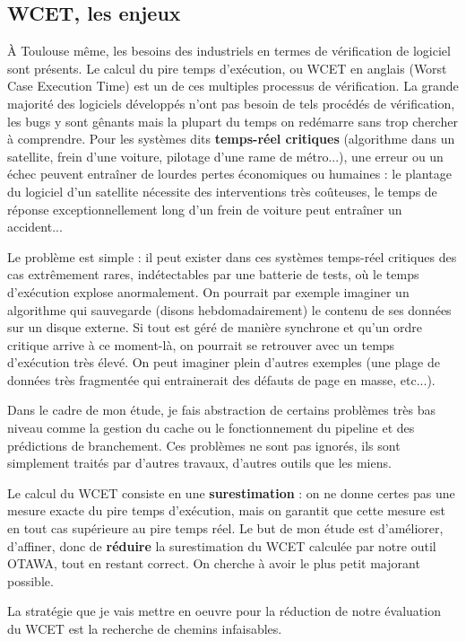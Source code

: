 \documentclass[french]{article}
\begin{document}
  \subsection{WCET, les enjeux}
  \`A Toulouse même, les besoins des industriels en termes de vérification de logiciel sont présents. Le calcul du pire temps d'exécution, ou WCET en anglais (Worst Case Execution Time) est un de ces multiples processus de vérification. La grande majorité des logiciels développés n'ont pas besoin de tels procédés de vérification, les bugs y sont gênants mais la plupart du temps on redémarre sans trop chercher à comprendre. Pour les systèmes dits \textbf{temps-réel critiques} (algorithme dans un satellite, frein d'une voiture, pilotage d'une rame de métro...), une erreur ou un échec peuvent entraîner de lourdes pertes économiques ou humaines : le plantage du logiciel d'un satellite nécessite des interventions très coûteuses, le temps de réponse exceptionnellement long d'un frein de voiture peut entraîner un accident...
  
  Le problème est simple : il peut exister dans ces systèmes temps-réel critiques des cas extrêmement rares, indétectables par une batterie de tests, où le temps d'exécution explose anormalement. On pourrait par exemple imaginer un algorithme qui sauvegarde (disons hebdomadairement) le contenu de ses données sur un disque externe. Si tout est géré de manière synchrone et qu'un ordre critique arrive à ce moment-là, on pourrait se retrouver avec un temps d'exécution très élevé. On peut imaginer plein d'autres exemples (une plage de données très fragmentée qui entrainerait des défauts de page en masse, etc...).
  
  Dans le cadre de mon étude, je fais abstraction de certains problèmes très bas niveau comme la gestion du cache ou le fonctionnement du pipeline et des prédictions de branchement. Ces problèmes ne sont pas ignorés, ils sont simplement traités par d'autres travaux, d'autres outils que les miens.
  
  Le calcul du WCET consiste en une \textbf{surestimation} : on ne donne certes pas une mesure exacte du pire temps d'exécution, mais on garantit que cette mesure est en tout cas supérieure au pire temps réel. Le but de mon étude est d'améliorer, d'affiner, donc de \textbf{réduire} la surestimation du WCET calculée par notre outil OTAWA, tout en restant correct. On cherche à avoir le plus petit majorant possible.
  
  La stratégie que je vais mettre en oeuvre pour la réduction de notre évaluation du WCET est la recherche de chemins infaisables.
  
\end{document}
